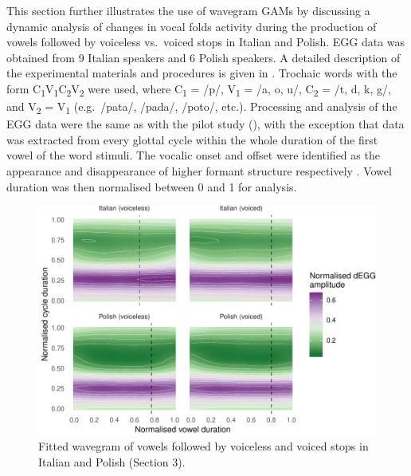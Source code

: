 \documentclass[
  11pt,
  a4paper,
]{article}
\begin{document}
\label{s:voicing}

This section further illustrates the use of wavegram GAMs by discussing
a dynamic analysis of changes in vocal folds activity during the
production of vowels followed by voiceless vs.~voiced stops in Italian
and Polish. EGG data was obtained from 9 Italian speakers and 6 Polish
speakers. A detailed description of the experimental materials and
procedures is given in \citet{coretta2018j}. Trochaic words with the
form
C\textsubscript{1}V\textsubscript{1}C\textsubscript{2}V\textsubscript{2}
were used, where C\textsubscript{1} = /p/, V\textsubscript{1} = /a, o,
u/, C\textsubscript{2} = /t, d, k, g/, and V\textsubscript{2} =
V\textsubscript{1} (e.g.~/pata/, /pada/, /poto/, etc.). Processing and
analysis of the EGG data were the same as with the pilot study
(), with the exception that data was extracted from every
glottal cycle within the whole duration of the first vowel of the word
stimuli. The vocalic onset and offset were identified as the appearance
and disappearance of higher formant structure respectively
\citep{machac2009}. Vowel duration was then normalised between 0 and 1
for analysis.

\begin{figure}
\includegraphics[width=\linewidth]{2019-wavegram_files/figure-latex/surface-1} \caption{Fitted wavegram of vowels followed by voiceless and voiced stops in Italian and Polish (Section 3).}\label{f:surface}
\end{figure}
\end{document}
